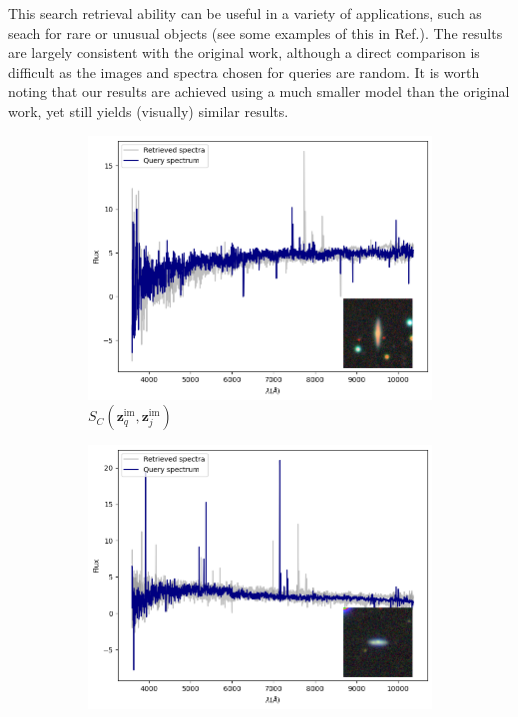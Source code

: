 \documentclass[a4paper,12pt]{article}
\begin{document}
This search retrieval ability can be useful in a variety of applications, such as seach for rare or unusual objects (see some examples of this in Ref.\cite{stein}). The results are largely consistent with the original work, although a direct comparison is difficult as the images and spectra chosen for queries are random. It is worth noting that our results are achieved using a much smaller model than the original work, yet still yields (visually) similar results.


\begin{figure}[H]
    \centering
    \vspace*{-1.3cm}

    \begin{subfigure}[b]{0.45\textwidth}
        \centering
        \includegraphics[width=\textwidth]{../figures/spectral_retrieval_im_im_1}
        \caption{$S_C(\mathbf{z}_q^{\text{im}}, \mathbf{z}_j^{\text{im}})$}
        \label{fig:im_im_1}
    \end{subfigure}%
    \hfill
    \begin{subfigure}[b]{0.45\textwidth}
        \centering
        \includegraphics[width=\textwidth]{../figures/spectral_retrieval_im_im_2}

\end{subfigure}
\end{figure}
\end{document}
